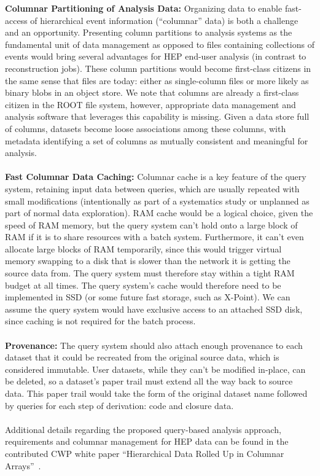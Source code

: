 \documentclass[12pt,a4paper]{article}
\begin{document}
{\bf Columnar Partitioning of Analysis Data:} Organizing data to enable fast-access of hierarchical event information (``columnar'' data) is both a challenge and an opportunity. Presenting column partitions to analysis systems as the fundamental unit of data management as opposed to files containing collections of events would bring several advantages for HEP end-user analysis (in contrast to reconstruction jobs). These column partitions would become first-class citizens in the same sense that files are today: either as single-column files or more likely as binary blobs in an object store. We note that columns are already a first-class citizen in the ROOT file system, however, appropriate data management and analysis software that leverages this capability is missing. Given a data store full of columns, datasets become loose associations among these columns, with metadata identifying a set of columns as mutually consistent and meaningful for analysis.\\ \\
{\bf Fast Columnar Data Caching:} Columnar cache is a key feature of the query system, retaining input data between queries, which are usually repeated with small modifications (intentionally as part of a systematics study or unplanned as part of normal data exploration). RAM cache would be a logical choice, given the speed of RAM memory, but the query system can't hold onto a large block of RAM if it is to share resources with a batch system. Furthermore, it can't even allocate large blocks of RAM temporarily, since this would trigger virtual memory swapping to a disk that is slower than the network it is getting the source data from. The query system must therefore stay within a tight RAM budget at all times. The query system's cache would therefore need to be implemented in SSD (or some future fast storage, such as X-Point). We can assume the query system would have exclusive access to an attached SSD disk, since caching is not required for the batch process.\\ \\
{\bf Provenance:} The query system should also attach enough provenance to each dataset that it could be recreated from the original source data, which is considered immutable. User datasets, while they can't be modified in-place, can be deleted, so a dataset's paper trail must extend all the way back to source data. This paper trail would take the form of the original dataset name followed by queries for each step of derivation: code and closure data.\\ \\
Additional details regarding the proposed query-based analysis approach, requirements and columnar management for HEP data can be found in the contributed CWP white paper ``Hierarchical Data Rolled Up in Columnar Arrays''~\cite{Pivarski2017}. 
\end{document}
